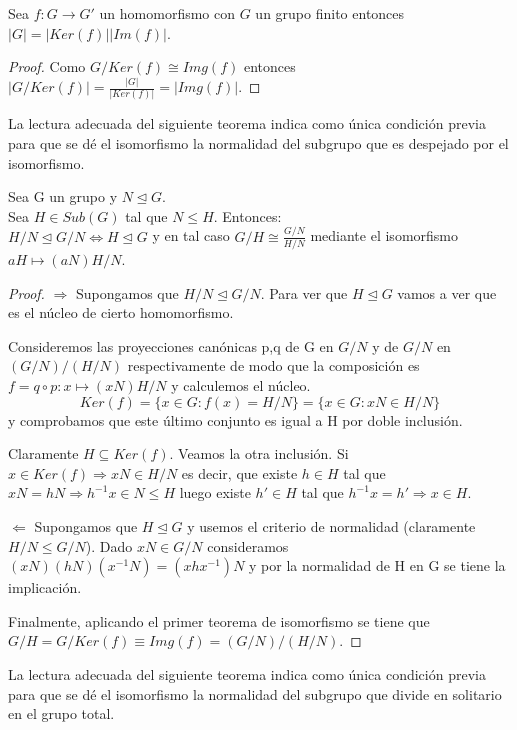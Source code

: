 \begin{corollary}
Sea $f:G \rightarrow G'$ un homomorfismo con $G$ un grupo finito entonces $|G| = |Ker(f)||Im(f)|$.
\end{corollary}
\begin{proof}
Como $G/Ker(f) \cong Img(f)$ entonces $|G/Ker(f)| = \frac{|G|}{|Ker(f)|} = |Img(f)|$.
\end{proof}

La lectura adecuada del siguiente teorema indica como única condición previa para que se dé el isomorfismo la normalidad del subgrupo que es despejado por el isomorfismo.

\begin{theorem}
Sea G un grupo y $N \trianglelefteq G$.\\ Sea $H \in Sub(G)$ tal que $N \le H$. Entonces:\\
$H/N \trianglelefteq G/N \iff H \trianglelefteq G$ y en tal caso $G/H \cong \frac{G/N}{H/N}$ mediante el isomorfismo $aH \mapsto (aN)H/N$.
\end{theorem}
\begin{proof}
$\Rightarrow$ Supongamos que $H/N \trianglelefteq G/N$. Para ver que $H \trianglelefteq G$ vamos a ver que es el núcleo de cierto homomorfismo.

Consideremos las proyecciones canónicas p,q de G en $G/N$ y de $G/N$ en $(G/N)/(H/N)$ respectivamente de modo que la composición es $f=q \circ p:x \mapsto (xN)H/N$ y calculemos el núcleo. $$Ker(f) = \{x \in G:f(x) = H/N\} = \{x \in G:xN \in H/N\}$$ y comprobamos que este último conjunto es igual a H por doble inclusión.

Claramente $H \subseteq Ker(f)$. Veamos la otra inclusión. Si $x \in Ker(f) \Rightarrow xN \in H/N$ es decir, que existe $h \in H$ tal que $xN = hN \Rightarrow h^{-1}x \in N \le H$ luego existe $h' \in H$ tal que $h^{-1}x = h' \Rightarrow x \in H$.

$\Leftarrow$ Supongamos que $H \trianglelefteq G$ y usemos el criterio de normalidad (claramente $H/N \le G/N$). Dado $xN \in G/N$ consideramos $(xN)(hN)(x^{-1}N) = (xhx^{-1})N$ y por la normalidad de H en G se tiene la implicación.

Finalmente, aplicando el primer teorema de isomorfismo se tiene que $G/H = G/Ker(f)  \equiv Img(f) = (G/N)/(H/N)$.
\end{proof}

La lectura adecuada del siguiente teorema indica como única condición previa para que se dé el isomorfismo la normalidad del subgrupo que divide en solitario en el grupo total.

